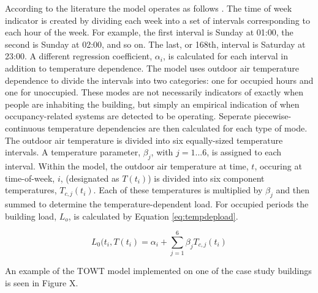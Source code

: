 According to the literature the model operates as follows \cite{price_methods_2010}. The time of week indicator is created by dividing each week into a set of intervals corresponding to each hour of the week. For example, the first interval is Sunday at 01:00, the second is Sunday at 02:00, and so on. The last, or 168th, interval is Saturday at 23:00. A different regression coefficient, $\alpha_i$, is calculated for each interval in addition to temperature dependence. The model uses outdoor air temperature dependence to divide the intervals into two categories: one for occupied hours and one for unoccupied. These modes are not necessarily indicators of exactly when people are inhabiting the building, but simply an empirical indication of when occupancy-related systems are detected to be operating. Seperate piecewise-continuous temperature dependencies are then calculated for each type of mode. The outdoor air temperature is divided into six equally-sized temperature intervals. A temperature parameter, $\beta_j$, with $j = 1...6$, is assigned to each interval. Within the model, the outdoor air temperature at time, $t$, occuring at time-of-week, $i$, (designated as $T(t_i)$) is divided into six component temperatures, $T_{c,j}(t_i)$. Each of these temperatures is multiplied by $\beta_j$ and then summed to determine the temperature-dependent load. For occupied periods the building load, $L_o$, is calculated by Equation \ref{eq:tempdepload}.

\begin{equation}
\label{eq:tempdepload}
L_0(t_i,T(t_i) = \alpha_i + \sum_{j=1}^{6}\beta_j T_{c,j}(t_i)
\end{equation}

An example of the TOWT model implemented on one of the case study buildings is seen in Figure X. 